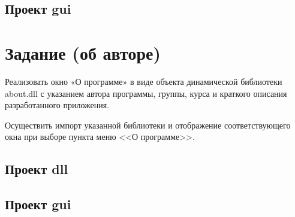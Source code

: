 





\subsection{Проект gui}






\section{Задание (об авторе)}

Реализовать окно «О программе» в виде объекта динамической библиотеки about.dll
с указанием автора программы, группы, курса и краткого описания разработанного приложения.

Осуществить импорт указанной библиотеки и отображение соответствующего окна при выборе пункта меню <<О программе>>.

\subsection{Проект dll}









\subsection{Проект gui}



